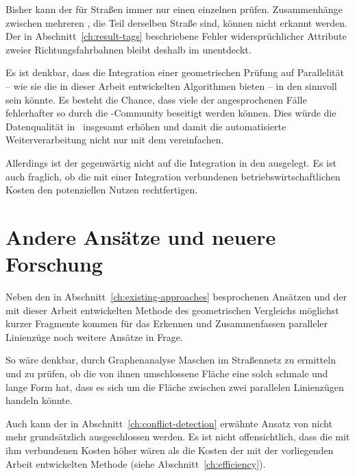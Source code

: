\documentclass[../main/thesis.tex]{subfiles}
\begin{document}
Bisher kann der  für Straßen immer nur einen einzelnen  prüfen.
Zusammenhänge zwischen mehreren , die Teil derselben Straße sind, können nicht erkannt werden.
Der in Abschnitt~\ref{ch:result-tags} beschriebene Fehler widersprüchlicher Attribute zweier Richtungsfahrbahnen bleibt deshalb im  unentdeckt.

Es ist denkbar, dass die Integration einer geometrischen Prüfung auf Parallelität -- wie sie die in dieser Arbeit entwickelten Algorithmen bieten -- in den  sinnvoll sein könnte.
Es besteht die Chance, dass viele der angesprochenen Fälle fehlerhafter  so durch die \osm-Community beseitigt werden können.
Dies würde die Datenqualität in \osm\ insgesamt erhöhen und damit die automatisierte Weiterverarbeitung nicht nur mit dem  vereinfachen.

Allerdings ist der  gegenwärtig nicht auf die Integration in den  ausgelegt.
Es ist auch fraglich, ob die mit einer Integration verbundenen betriebswirtschaftlichen Kosten den potenziellen Nutzen rechtfertigen.



\section{Andere Ansätze und neuere Forschung}
\label{ch:recent-research}

Neben den in Abschnitt~\ref{ch:existing-approaches} besprochenen Ansätzen und der mit dieser Arbeit entwickelten Methode des geometrischen Vergleichs möglichst kurzer Fragmente kommen für das Erkennen und Zusammenfassen paralleler Linienzüge noch weitere Ansätze in Frage.

So wäre denkbar, durch Graphenanalyse Maschen im Straßennetz zu ermitteln und zu prüfen, ob die von ihnen umschlossene Fläche eine solch schmale und lange Form hat, dass es sich um die Fläche zwischen zwei parallelen Linienzügen handeln könnte.

Auch kann der in Abschnitt~\ref{ch:conflict-detection} erwähnte Ansatz von \citeauthor{KP98} nicht mehr grundsätzlich ausgeschlossen werden.
Es ist nicht offensichtlich, dass die mit ihm verbundenen Kosten höher wären als die Kosten der mit der vorliegenden Arbeit entwickelten Methode (siehe Abschnitt~\ref{ch:efficiency}).
\end{document}
